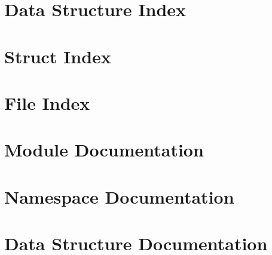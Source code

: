 \let\mypdfximage\pdfximage\def\pdfximage{\immediate\mypdfximage}\documentclass[twoside]{book}
\newcommand{\+}{\discretionary{\mbox{\scriptsize$\hookleftarrow$}}{}{}}
\begin{document}
\chapter{Data Structure Index}

\chapter{Struct Index}

\chapter{File Index}

\chapter{Module Documentation}































\chapter{Namespace Documentation}












\chapter{Data Structure Documentation}















\end{document}
